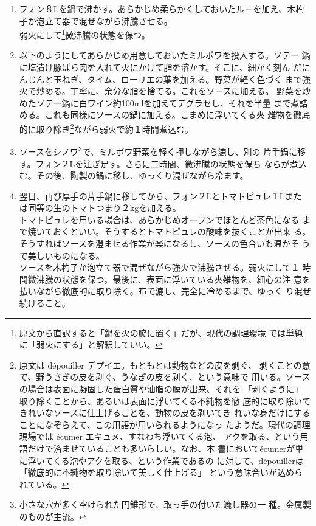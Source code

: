 \documentclass[twoside,12Q,b5paper]{escoffierltjsbook}
\newenvironment{recette}{\begin{multicols}{2}}{\end{multicols}}
\begin{document}
\begin{recette}
\begin{enumerate}
\def\labelenumi{\arabic{enumi}.}
\item
  フォン８Lを鍋で沸かす。あらかじめ柔らかくしておいたルーを加え、木杓
  子か泡立て器で混ぜながら沸騰させる。\\
  弱火にして\footnote{原文から直訳すると「鍋を火の脇に置く」だが、現代の調理環境
    では単純に「弱火にする」と解釈していい。}微沸騰の状態を保つ。
\item
  以下のようにしてあらかじめ用意しておいたミルポワを投入する。ソテー
  鍋に塩漬け豚ばら肉を入れて火にかけて脂を溶かす。そこに、細かく刻ん
  だにんじんと玉ねぎ、タイム、ローリエの葉を加える。野菜が軽く色づく
  まで強火で炒める。丁寧に、余分な脂を捨てる。これをソースに加える。
  野菜を炒めたソテー鍋に白ワイン約100mlを加えてデグラセし、それを半量
  まで煮詰める。これも同様にソースの鍋に加える。こまめに浮いてくる夾
  雑物を徹底的に取り除き\footnote{原文は dépouiller
    デプイエ。もともとは動物などの皮を剥ぐ、
    剥くことの意で、野うさぎの皮を剥ぐ、うなぎの皮を剥く、という意味で
    用いる。ソースの場合は表面に凝固した蛋白質や油脂の膜が出来、それを
    「剥ぐように」取り除くことから、あるいは表面に浮いてくる不純物を徹
    底的に取り除いてきれいなソースに仕上げることを、動物の皮を剥いてき
    れいな身だけにすることになぞらえて、この用語が用いられるようになっ
    たようだ。現代の調理現場では écumer エキュメ、すなわち浮いてくる泡、
    アクを取る、という用語だけで済ませていることも多いらしい。なお、本
    書においてécumerが単に浮いてくる泡やアクを取る、という作業であるの
    に対して、dépouillerは「徹底的に不純物を取り除いて美しく仕上げる」
    という意味合いが込められている。}ながら弱火で約１時間煮込む。
\item
  ソースをシノワ\footnote{小さな穴が多く空けられた円錐形で、取っ手の付いた漉し器の一
    種。金属製のものが主流。}で、ミルポワ野菜を軽く押しながら漉し、別の
  片手鍋に移す。フォン２Lを注ぎ足す。さらに二時間、微沸騰の状態を保ち
  ならが煮込む。その後、陶製の鍋に移し、ゆっくり混ぜながら冷ます。
\item
  翌日、再び厚手の片手鍋に移してから、フォン２Lとトマトピュレ１Lまた
  は同等の生のトマトつまり２kgを加える。\\
  トマトピュレを用いる場合は、あらかじめオーブンでほとんど茶色になる
  まで焼いておくといい。そうするとトマトピュレの酸味を抜くことが出来
  る。\\
  そうすればソースを澄ませる作業が楽になるし、ソースの色合いも温かそ
  うで美しいものになる。\\
  ソースを木杓子か泡立て器で混ぜながら強火で沸騰させる。弱火にして１
  時間微沸騰の状態を保つ。最後に、表面に浮いている夾雑物を、細心の注
  意を払いながら徹底的に取り除く。布で漉し、完全に冷めるまで、ゆっく
  り混ぜ続けること。
\end{enumerate}


\end{recette}
\end{document}
